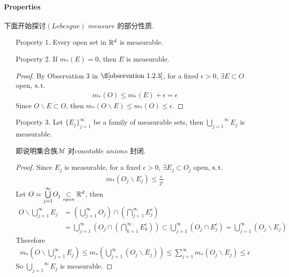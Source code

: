 \paragraph{Properties}
	下面开始探讨$(Lebesgue) \,\, measure$ 的部分性质.
	\begin{enumerate}
		\item[Property 1.]Every open set in $\mathbb{R}^d$ is measurable.
		
		\vspace{2em}
		
		\item[Property 2.]If $m_{*}(E) = 0$, then $E$ is measurable.
		\vspace{1em}
		\begin{proof}
			By Observation 3 in $\S \ref{observation 1.2.3}$, for a fixed $\epsilon > 0$, $\exists E \subset O$ open, $\operatorname{s.t.}$
			\begin{align}
				m_{*}(O) \leq m_{*}(E) + \epsilon = \epsilon
			\end{align}
			Since $O \backslash E \subset O$, then $m_{*}(O \backslash E) \leq m_{*}(O) \leq \epsilon$.
		\end{proof}
	
		\newpage
		\item[Property 3.]\label{property 1.3.3}Let $\{ E_j \}_{j = 1}^{\infty}$ be a family of measurable sets, then $\overset{\infty}{\underset{j = 1}{\bigcup}}{E_j}$ is measurable.
		\begin{rmk}
			即说明集合族$\mathcal{M}$ 对$countable \,\, unions$ 封闭.
		\end{rmk}
		\begin{proof}
			Since $E_j$ is measurable, for a fixed $\epsilon > 0$, $\exists E_j \subset O_j$ open, $\operatorname{s.t.}$
			\begin{align}
				m_{*}(O_j \backslash E_j) \leq \frac{\epsilon}{2^j}
			\end{align}
			Let $O = \overset{\infty}{\underset{j = 1}{\bigcup}}{O_j} \underset{open}{\subset} \mathbb{R}^d$, then 
			\begin{align}
				O \backslash \bigcup_{j = 1}^{\infty}{E_j} 
				&= \left( \bigcup_{j = 1}^{\infty}{O_j} \right) \cap \left( \bigcap_{j = 1}^{\infty}{E_{j}^c} \right) \\
				&= \bigcup_{j = 1}^{\infty}{\left( O_j \cap \left( \bigcap_{k = 1}^{\infty}{E_{k}^c} \right) \right)} 
				\subset \bigcup_{j = 1}^{\infty}{\left( O_j \cap E_{j}^c \right)} 
				= \bigcup_{j = 1}^{\infty}{\left( O_j \backslash E_{j} \right)}
			\end{align}
			Therefore
			\begin{align}
				m_{*}\left( O \backslash \bigcup_{j = 1}^{\infty}{E_j} \right) \leq m_{*}\left( \bigcup_{j = 1}^{\infty}{\left( O_j \backslash E_{j} \right)} \right) \leq \sum_{j = 1}^{\infty}{m_{*}\left( O_j \backslash E_j \right)} \leq \epsilon
			\end{align}
			So $\overset{\infty}{\underset{j = 1}{\bigcup}}{E_j}$ is measurable.
		\end{proof}
	

\end{enumerate}
